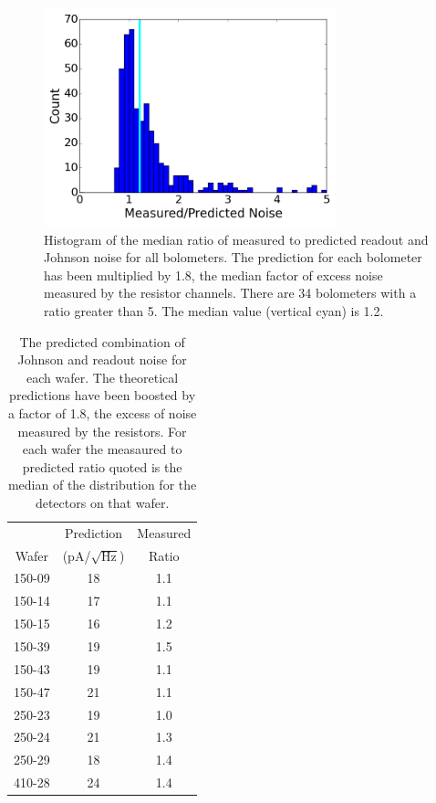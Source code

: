 \begin{figure}[htp]
\begin{center}
\includegraphics[height=2.5in]{figures/overbias_noise_ratios_histogram}
\caption[In-flight overbiased noise histograms]{Histogram of the median ratio of measured to predicted readout and Johnson noise for all bolometers. 
The prediction for each bolometer has been multiplied by 1.8, the median factor of excess noise measured by the resistor channels. 
There are 34 bolometers with a ratio greater than 5.
The median value (vertical cyan) is 1.2. 
\label{fig:overbias_noise_hist} }
\end{center}
\end{figure}

\begin{table}[htp]
\begin{center}
\begin{tabular}{| c | c | c |}
\hline  
           & Prediction           & Measured   \\
Wafer & (pA/$\sqrt{\mathrm{Hz}}$) & Ratio  \\
\hline 150-09 & 18 &  1.1 \\ 
\hline 150-14 & 17 &  1.1 \\ 
\hline 150-15 & 16 &  1.2 \\ 
\hline 150-39 & 19 &  1.5 \\ 
\hline 150-43 & 19 &  1.1 \\
\hline 150-47 & 21 &  1.1 \\
\hline 250-23 & 19 &  1.0 \\ 
\hline 250-24 & 21 &  1.3 \\ 
\hline 250-29 & 18 &  1.4 \\
\hline 410-28 & 24 &  1.4 \\
\hline
\end{tabular}
\end{center}
\caption[Median overbiased NEP predictions and measurements for each wafer]{The predicted combination of Johnson and readout noise for each wafer. The theoretical predictions have been boosted by a factor of 1.8, the excess of noise measured by the resistors. For each wafer the measaured to predicted ratio quoted is the median of the distribution for the detectors on that wafer. 
\label{tab:overbias_noise_table} }
\end{table}

